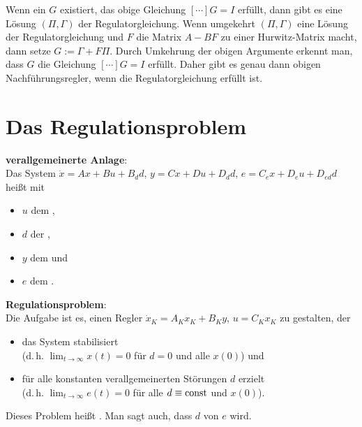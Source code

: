 Wenn ein $G$ existiert, das obige Gleichung $[\dotsb]G = I$ erfüllt,
dann gibt es eine Lösung $(\Pi, \Gamma)$ der Regulatorgleichung.
Wenn umgekehrt $(\Pi, \Gamma)$ eine Lösung der Regulatorgleichung und $F$ die Matrix
$A - BF$ zu einer Hurwitz-Matrix macht, dann setze $G := \Gamma + F\Pi$.
Durch Umkehrung der obigen Argumente erkennt man, dass $G$ die Gleichung $[\dotsb]G = I$ erfüllt.
Daher gibt es genau dann obigen Nachführungsregler, wenn die Regulatorgleichung erfüllt ist.

\pagebreak

\section{%
    Das Regulationsproblem%
}

\textbf{verallgemeinerte Anlage}:\\
Das System $\dot{x} = Ax + Bu + B_d d$, $y = Cx + Du + D_d d$, $e = C_e x + D_e u + D_{ed} d$
heißt  mit
\begin{itemize}
    \item
    $u$ dem ,

    \item
    $d$ der ,

    \item
    $y$ dem  und

    \item
    $e$ dem .
\end{itemize}

\textbf{Regulationsproblem}:\\
Die Aufgabe ist es, einen Regler $\dot{x}_K = A_K x_K + B_K y$, $u = C_K x_K$
zu gestalten, der
\begin{itemize}
    \item
    das System stabilisiert\\
    (d.\,h. $\lim_{t \to \infty} x(t) = 0$ für $d = 0$ und alle $x(0)$) und

    \item
    für alle konstanten verallgemeinerten Störungen $d$ erzielt\\
    (d.\,h. $\lim_{t \to \infty} e(t) = 0$ für alle $d \equiv \text{const}$ und $x(0)$).
\end{itemize}
Dieses Problem heißt .
Man sagt auch, dass $d$ von $e$
 wird.

